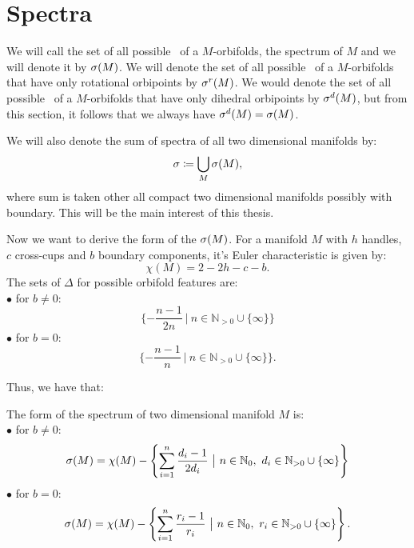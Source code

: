 

\section{Spectra}\label{spectra}
We will call the set of all possible \Eoc\ of a $M$-orbifolds, the spectrum of $M$ and 
we will denote it by ${{\sigma}(M)}$. We will denote the set of all possible \Eoc\ of a $M$-orbifolds 
that have only rotational orbipoints by ${\sigma}^r(M)$. 
We would denote the set of all possible \Eoc\ of a $M$-orbifolds 
that have only dihedral orbipoints by ${\sigma}^d(M)$, but from this section, it follows that 
we always have ${\sigma}^d(M) = {{\sigma}(M)}$. 

We will also denote the sum of spectra of all two dimensional manifolds by:
\begin{equation}
{\sigma} \coloneqq \bigcup_{M} {{\sigma}(M)},
\end{equation}
where sum is taken other all compact two dimensional manifolds possibly with boundary.
This will be the main interest of this thesis. 

Now we want to derive the form of the ${{\sigma}(M)}$.
For a manifold $M$ with $h$ handles, $c$ cross-cups and $b$ boundary components, it's 
Euler characteristic is given by:
\begin{equation}
\chi(M) = 2-2h-c-b.
\end{equation}
The sets of $\Delta$ for possible orbifold features are:\\
$\bullet$ for $b\neq 0$:
\begin{equation}
\{-\frac{n-1}{2n}\ \big|\ n\in\mathbb{N}_{>0}\cup \{\infty\}\}
\end{equation}
$\bullet$ for $b = 0$:
\begin{equation}
\{-\frac{n-1}{n}\ \big|\ n\in\mathbb{N}_{>0}\cup \{\infty\}\}.
\end{equation} 

Thus, we have that:
\begin{observation} 
\label{two dim manifold spectrum}
The form of the spectrum of two dimensional manifold $M$ is:\\
$\bullet$ for $b\neq 0$: 
\begin{equation}
\spe(M) = \chi(M) - \left\{\sum\limits_{i=1}^n\frac{d_i-1}{2d_i}\ 
\big|\ n\in\mathbb{N}_0,\ d_i\in\mathbb{N}_{>0}\cup \{\infty\}\right\}
\end{equation}
$\bullet$ for $b = 0$:
\begin{equation}
\spe(M) = \chi(M) - \left\{\sum\limits_{i=1}^n \frac{r_i-1}{r_i}\ \big|\ n\in\mathbb{N}_0,\ 
r_i\in\mathbb{N}_{>0}\cup \{\infty\}\right\}.
\end{equation}
\end{observation} 


